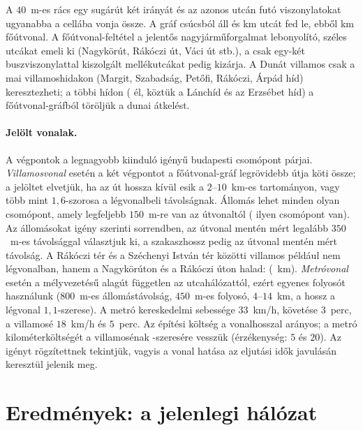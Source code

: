 \documentclass[12pt,a4paper]{article}
\theoremstyle{definition}
\theoremstyle{remark}
\begin{document}
A $40$~m-es rács egy sugárút két irányát és az azonos utcán futó
viszonylatokat ugyanabba a cellába vonja össze. A gráf \SGNODES{} csúcsból
áll és \SGALLKM{} km utcát fed le, ebből \SGMAINKM{} km főútvonal. A
főútvonal-feltétel a jelentős nagyjárműforgalmat lebonyolító, széles utcákat
emeli ki (Nagykörút, Rákóczi út, Váci út stb.), a csak egy-két
buszviszonylattal kiszolgált mellékutcákat pedig kizárja. A Dunát villamos csak
a mai villamoshidakon (Margit, Szabadság, Petőfi, Rákóczi, Árpád híd)
keresztezheti; a többi hídon (\SGBRIDGE{} él, köztük a Lánchíd és az Erzsébet
híd) a főútvonal-gráfból töröljük a dunai átkelést.

\paragraph{Jelölt vonalak.}
A végpontok a \NEND{} legnagyobb kiinduló igényű budapesti csomópont párjai.
\emph{Villamosvonal} esetén a két végpontot a főútvonal-gráf legrövidebb útja
köti össze; a jelöltet elvetjük, ha az út hossza kívül esik a $2$--$10$~km-es
tartományon, vagy több mint $1{,}6$-szorosa a légvonalbeli távolságnak.
Állomás lehet minden olyan csomópont, amely legfeljebb $150$~m-re van az
útvonaltól (\SGTRAMHUBS{} ilyen csomópont van). Az állomásokat igény szerinti
sorrendben, az útvonal mentén mért legalább $350$~m-es távolsággal
választjuk ki, a szakaszhossz pedig az útvonal mentén mért távolság. A
Rákóczi tér és a Széchenyi István tér közötti villamos például nem
légvonalban, hanem a Nagykörúton és a Rákóczi úton halad:
\EXROUTE{} (\EXLEN~km). \emph{Metróvonal} esetén a mélyvezetésű alagút
független az utcahálózattól, ezért egyenes folyosót használunk ($800$~m-es
állomástávolság, $450$~m-es folyosó, $4$--$14$~km, a hossz a légvonal
$1{,}1$-szerese). A metró kereskedelmi sebessége $33$~km/h, követése $3$~perc,
a villamosé $18$~km/h és $5$~perc. Az építési költség a vonalhosszal arányos;
a metró kilométerköltségét a villamosénak \COSTRATIO-szeresére vesszük
(érzékenység: $5$ és $20$). Az igényt rögzítettnek tekintjük, vagyis a vonal
hatása az eljutási idők javulásán keresztül jelenik meg.

\section{Eredmények: a jelenlegi hálózat}
\label{sec:eredmeny}
\end{document}
